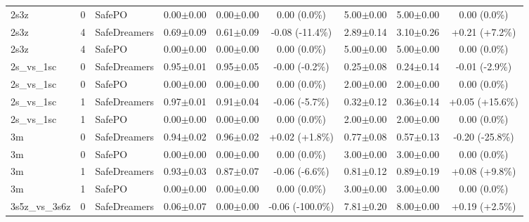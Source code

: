 \documentclass{article}
\begin{document}
\begin{longtable}{lclcccccc}
2s3z & 0 & SafePO & 0.00$\pm$0.00 & 0.00$\pm$0.00 & \textcolor{red!40!black}{0.00 (0.0\%)} & 5.00$\pm$0.00 & 5.00$\pm$0.00 & \textcolor{green!40!black}{0.00 (0.0\%)} \\
2s3z & 4 & SafeDreamers & 0.69$\pm$0.09 & 0.61$\pm$0.09 & \textcolor{red!55!black}{-0.08 (-11.4\%)} & 2.89$\pm$0.14 & 3.10$\pm$0.26 & \textcolor{red!55!black}{+0.21 (+7.2\%)} \\
2s3z & 4 & SafePO & 0.00$\pm$0.00 & 0.00$\pm$0.00 & \textcolor{red!40!black}{0.00 (0.0\%)} & 5.00$\pm$0.00 & 5.00$\pm$0.00 & \textcolor{green!40!black}{0.00 (0.0\%)} \\
\midrule
2s\_vs\_1sc & 0 & SafeDreamers & 0.95$\pm$0.01 & 0.95$\pm$0.05 & \textcolor{red!40!black}{-0.00 (-0.2\%)} & 0.25$\pm$0.08 & 0.24$\pm$0.14 & \textcolor{green!40!black}{-0.01 (-2.9\%)} \\
2s\_vs\_1sc & 0 & SafePO & 0.00$\pm$0.00 & 0.00$\pm$0.00 & \textcolor{red!40!black}{0.00 (0.0\%)} & 2.00$\pm$0.00 & 2.00$\pm$0.00 & \textcolor{green!40!black}{0.00 (0.0\%)} \\
2s\_vs\_1sc & 1 & SafeDreamers & 0.97$\pm$0.01 & 0.91$\pm$0.04 & \textcolor{red!55!black}{-0.06 (-5.7\%)} & 0.32$\pm$0.12 & 0.36$\pm$0.14 & \textcolor{red!70!black}{+0.05 (+15.6\%)} \\
2s\_vs\_1sc & 1 & SafePO & 0.00$\pm$0.00 & 0.00$\pm$0.00 & \textcolor{red!40!black}{0.00 (0.0\%)} & 2.00$\pm$0.00 & 2.00$\pm$0.00 & \textcolor{green!40!black}{0.00 (0.0\%)} \\
\midrule
3m & 0 & SafeDreamers & 0.94$\pm$0.02 & 0.96$\pm$0.02 & \textcolor{green!40!black}{+0.02 (+1.8\%)} & 0.77$\pm$0.08 & 0.57$\pm$0.13 & \textcolor{green!70!black}{-0.20 (-25.8\%)} \\
3m & 0 & SafePO & 0.00$\pm$0.00 & 0.00$\pm$0.00 & \textcolor{red!40!black}{0.00 (0.0\%)} & 3.00$\pm$0.00 & 3.00$\pm$0.00 & \textcolor{green!40!black}{0.00 (0.0\%)} \\
3m & 1 & SafeDreamers & 0.93$\pm$0.03 & 0.87$\pm$0.07 & \textcolor{red!55!black}{-0.06 (-6.6\%)} & 0.81$\pm$0.12 & 0.89$\pm$0.19 & \textcolor{red!55!black}{+0.08 (+9.8\%)} \\
3m & 1 & SafePO & 0.00$\pm$0.00 & 0.00$\pm$0.00 & \textcolor{red!40!black}{0.00 (0.0\%)} & 3.00$\pm$0.00 & 3.00$\pm$0.00 & \textcolor{green!40!black}{0.00 (0.0\%)} \\
\midrule
3s5z\_vs\_3s6z & 0 & SafeDreamers & 0.06$\pm$0.07 & 0.00$\pm$0.00 & \textcolor{red!100!black}{-0.06 (-100.0\%)} & 7.81$\pm$0.20 & 8.00$\pm$0.00 & \textcolor{red!40!black}{+0.19 (+2.5\%)} \\

\end{longtable}
\end{document}
